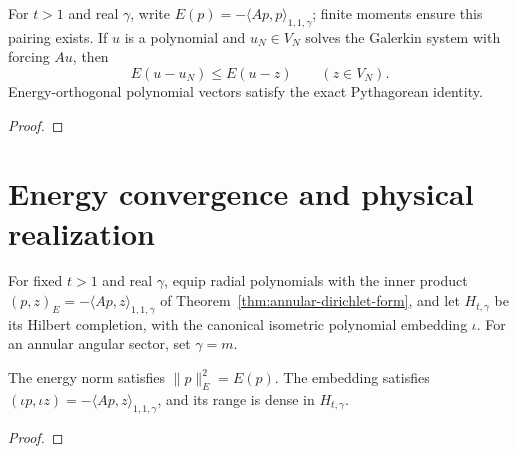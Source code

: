 \begin{supporting}
\begin{theorem}
\label{thm:annular-polynomial-best}
\leanok
For $t>1$ and real $\gamma$, write
$E(p)=-\langle Ap,p\rangle_{1,1,\gamma}$; finite moments ensure this pairing exists.
If $u$ is a polynomial and
$u_N\in V_N$ solves the Galerkin system with forcing $Au$, then
\[
 E(u-u_N)\le E(u-z)\qquad(z\in V_N).
\]
Energy-orthogonal polynomial vectors satisfy the exact Pythagorean identity.
\end{theorem}
\begin{proof}
\leanok
\end{proof}
\end{supporting}


\section{Energy convergence and physical realization}\label{sec:annular-energy}

\begin{supporting}
\begin{definition}
\label{def:annular-energy-completion}
\leanok
For fixed $t>1$ and real $\gamma$, equip radial polynomials with the inner
product $(p,z)_E=-\langle Ap,z\rangle_{1,1,\gamma}$ of
Theorem~\ref{thm:annular-dirichlet-form}, and let $H_{t,\gamma}$ be its Hilbert
completion, with the canonical isometric polynomial embedding $\iota$. For an
annular angular sector, set $\gamma=m$.
\end{definition}

\begin{theorem}
\label{thm:annular-energy-completion-basic}
\leanok
The energy norm satisfies $\|p\|_E^2=E(p)$. The embedding satisfies
$(\iota p,\iota z)=-\langle Ap,z\rangle_{1,1,\gamma}$, and its range is dense in
$H_{t,\gamma}$.
\end{theorem}
\begin{proof}
\leanok
\end{proof}
\end{supporting}


